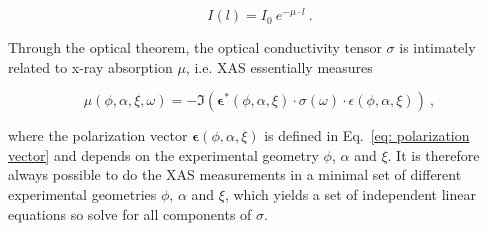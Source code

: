 \documentclass[twocolumn,prb,twocolumn,amsmath,superscriptaddress,nofootinbib,amssymb]{revtex4-1}
\newcommand{\vect}[1]{\boldsymbol{#1}}
\begin{document}
\begin{widetext}
\begin{equation}
I(l)=I_0~e^{-\mu\cdot l}~.
\end{equation}


%
%
%
%
%
%
%
%
%

Through the optical theorem, the optical conductivity tensor $\sigma$ is intimately related to x-ray absorption $\mu$, i.e. XAS essentially measures

\begin{equation}\label{eq: optical theorem}
\mu(\phi,\alpha,\xi,\omega)=-\Im\left(\vect{\epsilon}^*(\phi,\alpha,\xi)\cdot\sigma(\omega)\cdot\epsilon(\phi,\alpha,\xi)\right)~,
\end{equation}

\noindent where the polarization vector $\vect{\epsilon}(\phi,\alpha,\xi)$ is defined in Eq.~\ref{eq: polarization vector} and depends on the experimental geometry $\phi$, $\alpha$ and $\xi$. It is therefore always possible to do the XAS measurements in a minimal set of different experimental geometries $\phi$, $\alpha$ and $\xi$, which yields a set of independent linear equations so solve for all components of $\sigma$.



\end{widetext}
\end{document}
